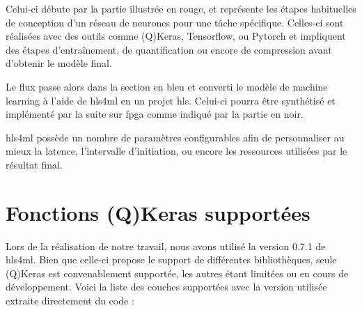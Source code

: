 Celui-ci débute par la partie illustrée en rouge, et représente les étapes habituelles de conception d'un réseau de neurones pour une tâche spécifique. Celles-ci sont réalisées avec des outils comme (Q)Keras, Tensorflow, ou Pytorch et impliquent des étapes d'entraînement, de quantification ou encore de compression avant d'obtenir le modèle final.

Le flux passe alors dans la section en bleu et converti le modèle de machine learning à l'aide de \acrshort{hls4ml} en un projet \acrshort{hls}. Celui-ci pourra être synthétisé et implémenté par la suite sur \acrshort{fpga} comme indiqué par la partie en noir.

\acrshort{hls4ml} possède un nombre de paramètres configurables afin de personnaliser au mieux la latence, l'intervalle d'initiation, ou encore les ressources utilisées par le résultat final.

\section{Fonctions (Q)Keras supportées}

Lors de la réalisation de notre travail, nous avons utilisé la version 0.7.1 de hls4ml. Bien que celle-ci propose le support de différentes bibliothèques, seule (Q)Keras est convenablement supportée, les autres étant limitées ou en cours de développement. Voici la liste des couches supportées avec la version utilisée extraite directement du code : \\

